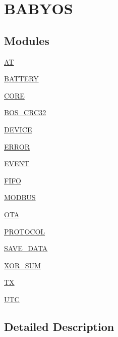 \hypertarget{group___b_a_b_y_o_s}{}\section{B\+A\+B\+Y\+OS}
\label{group___b_a_b_y_o_s}
\subsection*{Modules}
\begin{DoxyCompactItemize}
\item 
\mbox{\hyperlink{group___a_t}{AT}}
\item 
\mbox{\hyperlink{group___b_a_t_t_e_r_y}{B\+A\+T\+T\+E\+RY}}
\item 
\mbox{\hyperlink{group___c_o_r_e}{C\+O\+RE}}
\item 
\mbox{\hyperlink{group___b_o_s___c_r_c32}{B\+O\+S\+\_\+\+C\+R\+C32}}
\item 
\mbox{\hyperlink{group___d_e_v_i_c_e}{D\+E\+V\+I\+CE}}
\item 
\mbox{\hyperlink{group___e_r_r_o_r}{E\+R\+R\+OR}}
\item 
\mbox{\hyperlink{group___e_v_e_n_t}{E\+V\+E\+NT}}
\item 
\mbox{\hyperlink{group___f_i_f_o}{F\+I\+FO}}
\item 
\mbox{\hyperlink{group___m_o_d_b_u_s}{M\+O\+D\+B\+US}}
\item 
\mbox{\hyperlink{group___o_t_a}{O\+TA}}
\item 
\mbox{\hyperlink{group___p_r_o_t_o_c_o_l}{P\+R\+O\+T\+O\+C\+OL}}
\item 
\mbox{\hyperlink{group___s_a_v_e___d_a_t_a}{S\+A\+V\+E\+\_\+\+D\+A\+TA}}
\item 
\mbox{\hyperlink{group___x_o_r___s_u_m}{X\+O\+R\+\_\+\+S\+UM}}
\item 
\mbox{\hyperlink{group___t_x}{TX}}
\item 
\mbox{\hyperlink{group___u_t_c}{U\+TC}}
\end{DoxyCompactItemize}


\subsection{Detailed Description}
